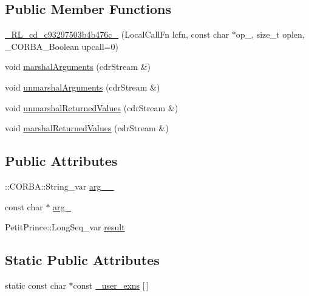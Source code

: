 \subsection*{Public Member Functions}
\begin{DoxyCompactItemize}
\item 
\hyperlink{class__0_r_l__cd__c93297503b4b476c__71000000_ae711a0879586fbc0bccb6887b7fc7bff}{\+\_\+R\+L\+\_\+cd\+\_\+c93297503b4b476c\+\_} (Local\+Call\+Fn lcfn, const char $\ast$op\+\_\+, size\+\_\+t oplen, \+\_\+\+C\+O\+R\+B\+A\+\_\+\+Boolean upcall=0)
\item 
void \hyperlink{class__0_r_l__cd__c93297503b4b476c__71000000_a3839819b898206d349b14e6b4aa4a74a}{marshal\+Arguments} (cdr\+Stream \&)
\item 
void \hyperlink{class__0_r_l__cd__c93297503b4b476c__71000000_ac438529ffd9dabbf8e353a1e38de57ea}{unmarshal\+Arguments} (cdr\+Stream \&)
\item 
void \hyperlink{class__0_r_l__cd__c93297503b4b476c__71000000_a4006a83ad5a5c7e5edd51341cd8c6324}{unmarshal\+Returned\+Values} (cdr\+Stream \&)
\item 
void \hyperlink{class__0_r_l__cd__c93297503b4b476c__71000000_a1c622901175edcd45e3f5144a98b55ee}{marshal\+Returned\+Values} (cdr\+Stream \&)
\end{DoxyCompactItemize}
\subsection*{Public Attributes}
\begin{DoxyCompactItemize}
\item 
\+::C\+O\+R\+B\+A\+::\+String\+\_\+var \hyperlink{class__0_r_l__cd__c93297503b4b476c__71000000_a6c99db7522f081f5f960329aa52f2939}{arg\+\_\+\_\+}
\item 
const char $\ast$ \hyperlink{class__0_r_l__cd__c93297503b4b476c__71000000_a39f171638e7d97e43ebabca56ce6f925}{arg\+\_}
\item 
Petit\+Prince\+::\+Long\+Seq\+\_\+var \hyperlink{class__0_r_l__cd__c93297503b4b476c__71000000_af3a56f469452c58aa0b15ff954198b07}{result}
\end{DoxyCompactItemize}
\subsection*{Static Public Attributes}
\begin{DoxyCompactItemize}
\item 
static const char $\ast$const \hyperlink{class__0_r_l__cd__c93297503b4b476c__71000000_a9041720817a437b67d07c1b7ac18c903}{\+\_\+user\+\_\+exns} \mbox{[}$\,$\mbox{]}
\end{DoxyCompactItemize}


